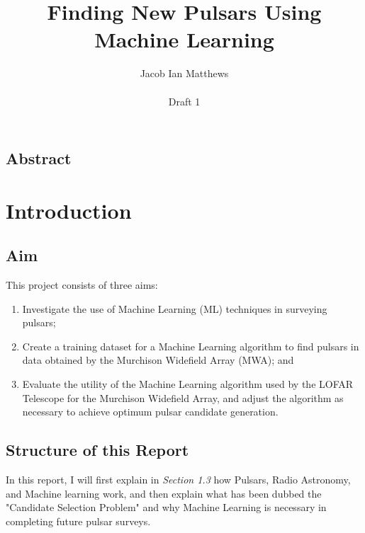 \documentclass{article}
\title{Finding New Pulsars Using Machine Learning}
\author{Jacob Ian Matthews \\ \\ Draft 1}
\begin{document}
\begin{titlepage}
    
    \maketitle

    \section*{Abstract}

\end{titlepage}

\pagebreak

\tableofcontents

\pagebreak


\section{Introduction}

\subsection{Aim}

This project consists of three aims:
\begin{enumerate}[label=\roman*.]
    \item Investigate the use of Machine Learning (ML) techniques in surveying pulsars;
    \item Create a training dataset for a Machine Learning algorithm to find pulsars in data obtained by the Murchison Widefield Array (MWA); and
    \item Evaluate the utility of the Machine Learning algorithm used by the LOFAR Telescope for the Murchison Widefield Array, and adjust the algorithm as necessary to achieve optimum pulsar candidate generation.
\end{enumerate}

\subsection{Structure of this Report}

In this report, I will first explain in \emph{Section 1.3} how Pulsars, Radio Astronomy, and Machine learning work, and then explain what has been dubbed the "Candidate Selection Problem" \autocite{lyon} and why Machine Learning is necessary in completing future pulsar surveys.
\end{document}
